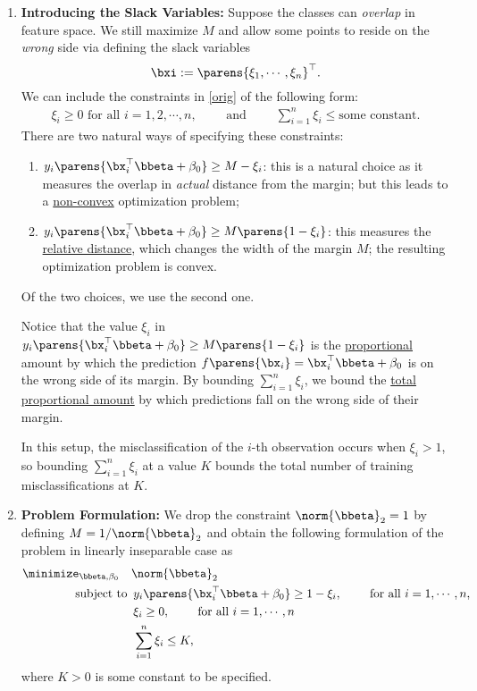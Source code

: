 \documentclass[12pt]{article}
\begin{document}
\begin{enumerate}[label=\textbf{\arabic*.}]

	\item \textbf{Introducing the Slack Variables:} Suppose the classes can \emph{overlap} in feature space. We still maximize $M$ and allow some points to reside on the \emph{wrong} side via defining the slack variables 
	\begin{equation*}
		\bxi := \parens{\xi_1, \cdots, \xi_n}^\top. 
	\end{equation*}
	We can include the constraints in \eqref{orig} of the following form: 
	\begin{align*}
		\xi_i \ge 0 \text{ for all } i = 1, 2, \cdots, n, \qquad \text{ and } \qquad \sum_{i=1}^n \xi_i \le \text{some constant}. 
	\end{align*}
	There are two natural ways of specifying these constraints: 
	\begin{enumerate}
		\item $y_i \parens{\bx_i^\top \bbeta + \beta_0} \ge M - \xi_i$: this is a natural choice as it measures the overlap in \emph{actual} distance from the margin; but this leads to a \underline{non-convex} optimization problem; 
		\item $y_i \parens{\bx_i^\top \bbeta + \beta_0 } \ge M \parens{1 - \xi_i}$: this measures the \underline{relative distance}, which changes the width of the margin $M$; the resulting optimization problem is convex. 
	\end{enumerate}
	Of the two choices, we use the second one. 
	
	Notice that the value $\xi_i$ in $y_i \parens{\bx_i^\top \bbeta + \beta_0 } \ge M \parens{1-\xi_i}$ is the \underline{proportional} amount by which the prediction $ f \parens{\bx_i} = \bx_i^\top \bbeta + \beta_0$ is on the wrong side of its margin. By bounding $\sum_{i=1}^n \xi_i$, we bound the \underline{total proportional amount} by which predictions fall on the wrong side of their margin. 
	
	In this setup, the misclassification of the $i$-th observation occurs when $\xi_i > 1$, so bounding $\sum_{i=1}^n \xi_i$ at a value $K$ bounds the total number of training misclassifications at $K$. 
	
	\item \textbf{Problem Formulation:} We drop the constraint $\norm{\bbeta}_2 = 1$ by defining $M = 1/\norm{\bbeta}_2$ and obtain the following formulation of the problem in linearly inseparable case as 
	\begin{equation}\label{eq-nonsep}
		\begin{aligned}
			\minimize_{\bbeta, \beta_0} \hspace{10pt} & \norm{\bbeta}_2 \\
			\text{subject to } & \, y_i \parens{\bx_i^\top \bbeta + \beta_0} \ge 1 - \xi_i, \qquad \text{ for all } i = 1, \cdots, n, \\ 
			& \, \xi_i \ge 0, \qquad \text{ for all } i = 1, \cdots, n \\ 
			& \, \sum_{i=1}^n \xi_i \le K, 
		\end{aligned}
	\end{equation}
	where $K > 0$ is some constant to be specified. 
	

\end{enumerate}
\end{document}
